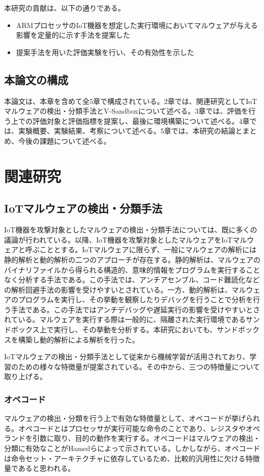 \documentclass[12pt,a4paper,titlepage,report]{jsbook}
\begin{document}
本研究の貢献は、以下の通りである。
\begin{itemize}
    \item ARMプロセッサのIoT機器を想定した実行環境においてマルウェアが与える影響を定量的に示す手法を提案した
    \item 提案手法を用いた評価実験を行い、その有効性を示した
\end{itemize}

\section{本論文の構成}
本論文は、本章を含めて全5章で構成されている。2章では、関連研究としてIoTマルウェアの検出・分類手法とV-Sandboxについて述べる。3章では、評価を行う上での評価対象と評価指標を提案し、最後に環境構築について述べる。4章では、実験概要、実験結果、考察について述べる。5章では、本研究の結論とまとめ、今後の課題について述べる。




\chapter{関連研究}
\section{IoTマルウェアの検出・分類手法}
IoT機器を攻撃対象としたマルウェアの検出・分類手法については、既に多くの議論が行われている。以降、IoT機器を攻撃対象としたマルウェアをIoTマルウェアと呼ぶこととする。IoTマルウェアに限らず、一般にマルウェアの解析には静的解析と動的解析の二つのアプローチが存在する\cite{malwaresurvey}。静的解析は、マルウェアのバイナリファイルから得られる構造的、意味的情報をプログラムを実行することなく分析する手法である。この手法では、アンチアセンブル、コード難読化などの解析回避手法の影響を受けやすいとされている。一方、動的解析は、マルウェアのプログラムを実行し、その挙動を観察したりデバッグを行うことで分析を行う手法である。この手法ではアンチデバッグや遅延実行の影響を受けやすいとされている。マルウェアを実行する際は一般的に、隔離された実行環境であるサンドボックス上で実行し、その挙動を分析する。本研究においても、サンドボックスを構築し動的解析による解析を行った。

IoTマルウェアの検出・分類手法として従来から機械学習が活用されており、学習のための様々な特徴量\cite{malwaresurvey}が提案されている。その中から、三つの特徴量について取り上げる。

\subsection{オペコード}
マルウェアの検出・分類を行う上で有効な特徴量として、オペコードが挙げられる。オペコードとはプロセッサが実行可能な命令のことであり、レジスタやオペランドを引数に取り、目的の動作を実行する。オペコードはマルウェアの検出・分類に有効なことがHamedらによって示されている\cite{opcode}。しかしながら、オペコードは命令セット・アーキテクチャに依存しているため、比較的汎用性に欠ける特徴量であると思われる。
\end{document}
